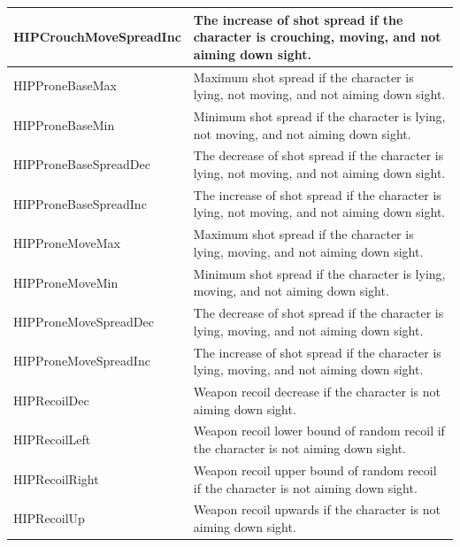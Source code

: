 \documentclass[MGS,Master,english]{twbook}%
\begin{document}
\begin{longtable}[c]{|l|p{10.5cm}|}
	HIPCrouchMoveSpreadInc & The increase of shot spread if the character is crouching, moving, and not aiming down sight.                                  \\ \hline
	HIPProneBaseMax        & Maximum shot spread if the character is lying, not moving, and not aiming down sight.                                          \\ \hline
	HIPProneBaseMin        & Minimum shot spread if the character is lying, not moving, and not aiming down sight.                                          \\ \hline
	HIPProneBaseSpreadDec  & The decrease of shot spread if the character is lying, not moving, and not aiming down sight.                                  \\ \hline
	HIPProneBaseSpreadInc  & The increase of shot spread if the character is lying, not moving, and not aiming down sight.                                  \\ \hline
	HIPProneMoveMax        & Maximum shot spread if the character is lying, moving, and not aiming down sight.                                              \\ \hline
	HIPProneMoveMin        & Minimum shot spread if the character is lying, moving, and not aiming down sight.                                              \\ \hline
	HIPProneMoveSpreadDec  & The decrease of shot spread if the character is lying, moving, and not aiming down sight.                                      \\ \hline
	HIPProneMoveSpreadInc  & The increase of shot spread if the character is lying, moving, and not aiming down sight.                                      \\ \hline
	HIPRecoilDec           & Weapon recoil decrease if the character is not aiming down sight.                                                              \\ \hline
	HIPRecoilLeft          & Weapon recoil lower bound of random recoil if the character is not aiming down sight.                                          \\ \hline
	HIPRecoilRight         & Weapon recoil upper bound of random recoil if the character is not aiming down sight.                                          \\ \hline
	HIPRecoilUp            & Weapon recoil upwards if the character is not aiming down sight.                                                               \\ \hline

\end{longtable}
\end{document}

